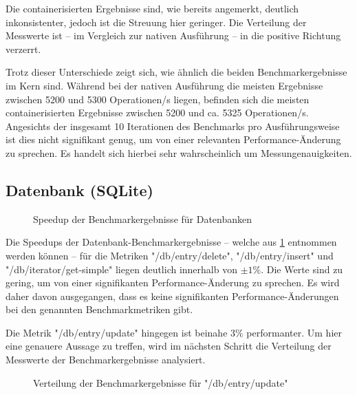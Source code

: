 Die containerisierten Ergebnisse sind, wie bereits angemerkt, deutlich inkonsistenter, jedoch ist die Streuung hier geringer. Die Verteilung der Messwerte ist – im Vergleich zur nativen Ausführung – in die positive Richtung verzerrt. 

Trotz dieser Unterschiede zeigt sich, wie ähnlich die beiden Benchmarkergebnisse im Kern sind. Während bei der nativen Ausführung die meisten Ergebnisse zwischen 5200 und 5300 Operationen/s liegen, befinden sich die meisten containerisierten Ergebnisse zwischen 5200 und ca. 5325 Operationen/s. Angesichts der insgesamt 10 Iterationen des Benchmarks pro Ausführungsweise ist dies nicht signifikant genug, um von einer relevanten Performance-Änderung zu sprechen. Es handelt sich hierbei sehr wahrscheinlich um Messungenauigkeiten. 


\subsection{Datenbank (SQLite)}

\begin{figure}[H]
    \centering
    
    \caption{Speedup der Benchmarkergebnisse für Datenbanken}
    \label{fig:speedup_db}
\end{figure}

\FloatBarrier

Die Speedups der Datenbank-Benchmarkergebnisse – welche aus \cref{fig:speedup_db} entnommen werden können – für die Metriken "/db/entry/delete", "/db/entry/insert" und "/db/iterator/get-simple" liegen deutlich innerhalb von $\pm 1\%$. Die Werte sind zu gering, um von einer signifikanten Performance-Änderung zu sprechen. Es wird daher davon ausgegangen, dass es keine signifikanten Performance-Änderungen bei den genannten Benchmarkmetriken gibt.

Die Metrik "/db/entry/update" hingegen ist beinahe $3\%$ performanter. Um hier eine genauere Aussage zu treffen, wird im nächsten Schritt die Verteilung der Messwerte der Benchmarkergebnisse analysiert.

\begin{figure}[H]
    \centering
    
    \caption{Verteilung der Benchmarkergebnisse für "/db/entry/update"}
    \label{fig:mdist_db_entry_update}
\end{figure}

